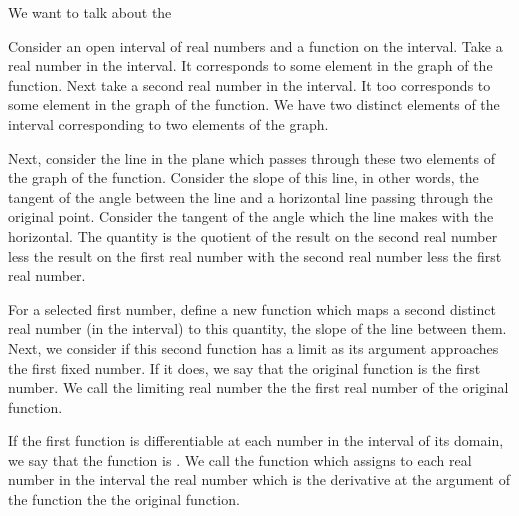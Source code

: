 
\sbasic























\sstart
{}


We want to talk about
the


Consider an open interval of
real numbers and a function on
the interval.
Take a real number in the interval.
It corresponds to some element in
the graph of the function.
Next take a second real number in the interval.
It too corresponds to some element in
the graph of the function.
We have two distinct elements of the
interval corresponding to two elements of the graph.

Next, consider the line in the plane which passes
through these two elements of the graph of the
function.
Consider the slope of this line, in other words,
the tangent of the angle between the line
and a horizontal line passing through the
original point.
Consider the tangent of the angle which the line
makes with the horizontal.
The quantity is the quotient
of the result on the second real number
less the result on the first real number
with the second real number less the first
real number.

For a selected first number,
define a new function which maps
a second distinct real number (in the interval)
to this quantity, the slope of the line
between them.
Next, we consider if this second function
has a limit as its argument approaches
the first fixed number.
If it does, we say that the original function is
 the first number.
We call the limiting real number the
 the first real number of
the original function.

If the first function is differentiable at
each number in the interval of its domain,
we say that the function is .
We call the function which assigns to each
real number in the interval the real number
which is the derivative at the argument of
the function the  the
original function.

